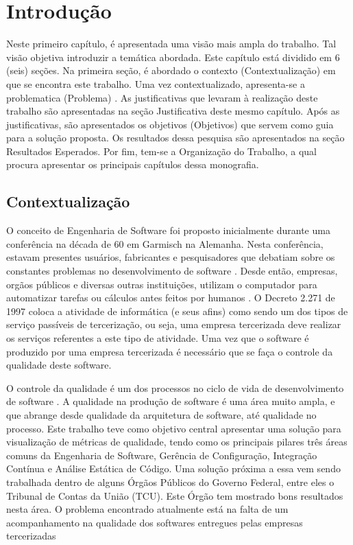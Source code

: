 \chapter[Introdução]{Introdução}
	Neste primeiro capítulo, é apresentada uma visão mais ampla do trabalho. Tal visão objetiva introduzir a temática abordada. Este capítulo está dividido em 6 (seis) seções. Na primeira seção, é abordado o contexto (Contextualização) em que se encontra este trabalho. Uma vez contextualizado, apresenta-se a problematica (Problema) . As justificativas que levaram à realização deste trabalho são apresentadas na seção Justificativa deste mesmo capítulo. Após as justificativas, são apresentados os objetivos (Objetivos) que servem como guia para a solução proposta. Os resultados dessa pesquisa  são apresentados na seção Resultados Esperados. Por fim, tem-se a Organização do Trabalho, a qual procura apresentar os principais capítulos dessa monografia.


\section{Contextualização}
	O conceito de Engenharia de Software foi proposto inicialmente durante uma conferência na década de 60 em Garmisch na Alemanha. Nesta conferência, estavam presentes usuários, fabricantes e pesquisadores que debatiam sobre os constantes problemas no desenvolvimento de software \cite{Paduelli}. Desde então, empresas, orgãos públicos e diversas outras instituições, utilizam o computador para automatizar tarefas ou cálculos antes feitos por humanos \cite{fonseca2007historia}. O Decreto 2.271 de 1997 \cite{decreto_2271} coloca a atividade de informática (e seus afins) como sendo um dos tipos de serviço passíveis de tercerização, ou seja, uma empresa tercerizada deve realizar os serviços referentes a este tipo de atividade. Uma vez que o software é produzido por uma empresa tercerizada é necessário que se faça o controle da qualidade deste software.

O controle da qualidade é um dos processos no ciclo de vida de desenvolvimento de software \cite{machado_metricas_2004}. A qualidade na produção de software é uma área muito ampla, e que abrange desde qualidade da arquitetura de software, até qualidade no processo. Este trabalho teve como objetivo central apresentar uma solução para visualização de métricas de qualidade, tendo como os principais pilares três áreas comuns da Engenharia de Software, Gerência de Configuração, Integração Contínua e Análise Estática de Código. Uma solução próxima a essa vem sendo trabalhada dentro de alguns Órgãos Públicos do Governo Federal, entre eles o Tribunal de Contas da União (TCU). Este Órgão tem mostrado bons resultados nesta área. O problema encontrado atualmente está na falta de um acompanhamento na qualidade dos softwares entregues pelas empresas tercerizadas 	

